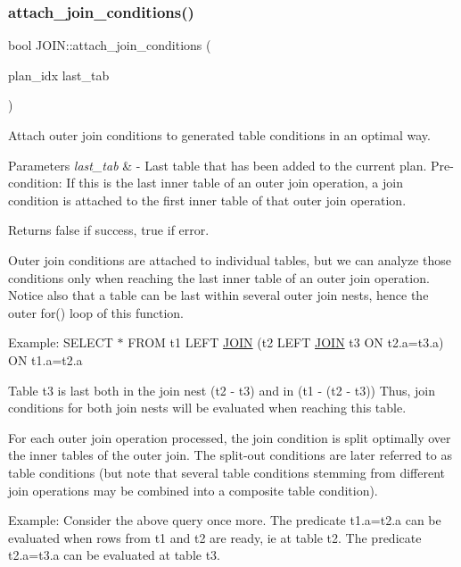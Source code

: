 \subsubsection{\texorpdfstring{attach\+\_\+join\+\_\+conditions()}{attach\_join\_conditions()}}
{\footnotesize\ttfamily bool J\+O\+I\+N\+::attach\+\_\+join\+\_\+conditions (\begin{DoxyParamCaption}\item[{plan\+\_\+idx}]{last\+\_\+tab }\end{DoxyParamCaption})}

Attach outer join conditions to generated table conditions in an optimal way.


\begin{DoxyParams}{Parameters}
{\em last\+\_\+tab} & -\/ Last table that has been added to the current plan. Pre-\/condition\+: If this is the last inner table of an outer join operation, a join condition is attached to the first inner table of that outer join operation.\\
\hline
\end{DoxyParams}
\begin{DoxyReturn}{Returns}
false if success, true if error.
\end{DoxyReturn}
Outer join conditions are attached to individual tables, but we can analyze those conditions only when reaching the last inner table of an outer join operation. Notice also that a table can be last within several outer join nests, hence the outer for() loop of this function.

Example\+: S\+E\+L\+E\+CT $\ast$ F\+R\+OM t1 L\+E\+FT \mbox{\hyperlink{classJOIN}{J\+O\+IN}} (t2 L\+E\+FT \mbox{\hyperlink{classJOIN}{J\+O\+IN}} t3 ON t2.\+a=t3.\+a) ON t1.\+a=t2.\+a

Table t3 is last both in the join nest (t2 -\/ t3) and in (t1 -\/ (t2 -\/ t3)) Thus, join conditions for both join nests will be evaluated when reaching this table.

For each outer join operation processed, the join condition is split optimally over the inner tables of the outer join. The split-\/out conditions are later referred to as table conditions (but note that several table conditions stemming from different join operations may be combined into a composite table condition).

Example\+: Consider the above query once more. The predicate t1.\+a=t2.\+a can be evaluated when rows from t1 and t2 are ready, ie at table t2. The predicate t2.\+a=t3.\+a can be evaluated at table t3.

